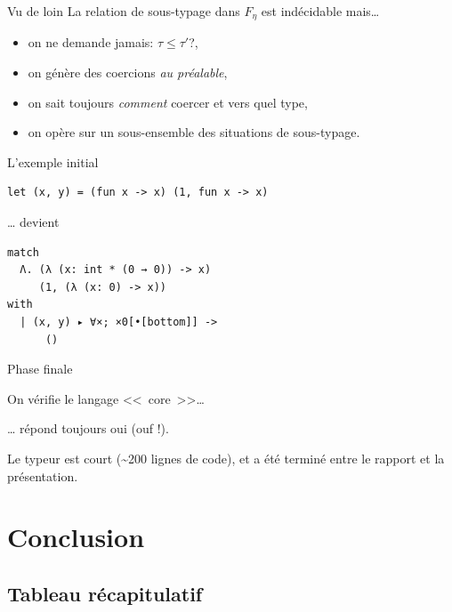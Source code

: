 \documentclass[final]{beamer}
\newcommand{\red}[1]{\textcolor[HTML]{F7800A}{#1}}
\begin{document}
\begin{frame}{Vu de loin}
  La relation de sous-typage dans $F_\eta$ est indécidable mais…
  \begin{itemize}
    \item on ne demande jamais: $\tau \leq \tau'$?,
    \item on génère des coercions \emph{au préalable},
    \item on sait toujours \emph{comment} coercer et vers quel type,
    \item on opère sur un sous-ensemble des situations de sous-typage.
  \end{itemize}
\end{frame}

\begin{frame}[fragile]{L'exemple initial}

  \begin{verbatim}
let (x, y) = (fun x -> x) (1, fun x -> x)
  \end{verbatim}

  … devient

  \begin{verbatim}
match
  Λ. (λ (x: int * (0 → 0)) -> x)
     (1, (λ (x: 0) -> x))
with
  | (x, y) ▸ ∀×; ×0[•[bottom]] ->
      ()
  \end{verbatim}

\end{frame}

\begin{frame}{Phase finale}
  \begin{center}
On vérifie le langage <<~core~>>…

\vspace{5ex}

… répond toujours oui (\red{ouf !}).
  \end{center}

  \vspace{2em}

  Le typeur est court (\textasciitilde 200 lignes de code), et a été terminé entre
  le rapport et la présentation.
\end{frame}

\section{Conclusion}

\subsection{Tableau récapitulatif}
\end{document}
